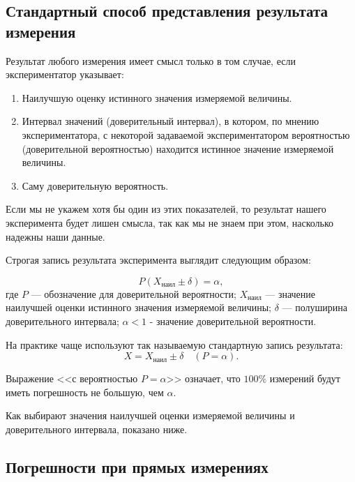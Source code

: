 \documentclass[a4paper, 12pt]{extarticle}
\begin{document}
\subsection{Стандартный способ представления результата измерения}

Результат любого измерения имеет смысл только в том случае, если экспериментатор указывает:

\begin{enumerate}
  \item Наилучшую оценку истинного значения измеряемой величины.
  \item Интервал значений (доверительный интервал), в котором, по мнению экспериментатора, с некоторой задаваемой экспериментатором вероятностью (доверительной вероятностью) находится истинное значение измеряемой величины.
  \item Саму доверительную вероятность.
\end{enumerate}

Если мы не укажем хотя бы один из этих показателей, то результат нашего эксперимента будет лишен смысла, так как мы не знаем при этом, насколько надежны наши данные.

Строгая запись результата эксперимента выглядит следующим образом:

\begin{equation}
\label{eq:exact-form}
P(X_{\text{наил}} \pm \delta) = \alpha,
\end{equation}
где $P$ --- обозначение для доверительной вероятности; $X_{\text{наил}}$ --- значение
наилучшей оценки истинного значения измеряемой величины; $\delta$ --- полуширина доверительного интервала; $\alpha < 1$ - значение доверительной вероятности.

На практике чаще используют так называемую стандартную
запись результата:
\begin{equation}
\label{eq:practical-form}
X = X_{\text{наил}} \pm \delta \quad \left(P = \alpha\right).
\end{equation}

Выражение <<с вероятностью $P = \alpha$>> означает, что $100\%$ измерений будут иметь погрешность не большую, чем $\alpha$.

Как выбирают значения наилучшей оценки измеряемой величины и доверительного интервала, показано ниже.


\subsection{Погрешности при прямых измерениях}
\end{document}
